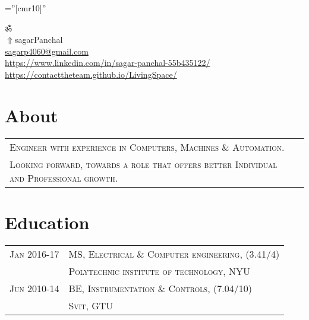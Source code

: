 \documentclass[a4paper]{article}
\begin{document}
\pagestyle{empty} 						%
\font\fb=''[cmr10]'' 						%

\par	{\centering
	ॐ																																\\
	\href{https://contacttheteam.github.io/LivingSpace/}{$ \Uparrow$}{sagarPanchal}																																\\
	\small \href{mailto:sagarp4060@gmail.com}{sagarp4060@gmail.com}																						\\
	\small \href{https://www.linkedin.com/in/sagar-panchal-55b435122/}{https://www.linkedin.com/in/sagar-panchal-55b435122/}		\textbullet \href{https://contacttheteam.github.io/LivingSpace/}{https://contacttheteam.github.io/LivingSpace/}		\par}
	
\section	{	About		}
	\begin{tabular}{ll}
		\textsc{	Engineer with experience in Computers,  Machines \& Automation.					}\\
		\textsc{	Looking forward,  towards a role that offers better Individual and Professional growth.	}
	\\\end{tabular}



\section	{	Education		}
	\begin{tabular}{rl}
		\small{}\textsc{		Jan 2016-17	} 		& 		\textsc{	MS, Electrical \& Computer engineering, 		\small {(3.41/4)}			}	\\
 											& 		\textsc{	Polytechnic institute of technology, NYU							}	\\
 		\small{}\textsc{		Jun 2010-14	} 		& 		\textsc{	BE, Instrumentation \small{\&} Controls,		\small {(7.04/10)}		}	\\
 											& 		\textsc{	Svit, GTU													}	\\
	\end{tabular}
\end{document}
